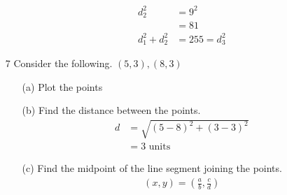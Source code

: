 \documentclass{article}
\begin{document}
\begin{enumerate}[widest={1}]
\begin{enumerate}
\begin{align*}
						d_2^2 &= 9^2 \\
						&= 81 \\
						d_1^2 + d_2^2 &= 255 = d_3^2
					\end{align*}
				\end{enumerate}
				\item[7] Consider the following. $(5, 3), (8, 3)$
				\begin{enumerate}
					\item[(a)] Plot the points
					\item[(b)] Find the distance between the points.
					\begin{align*}
						d &= \sqrt{(5-8)^2+(3-3)^2} \\
						  &= 3 \text{ units}
					\end{align*}
					\item[(c)] Find the midpoint of the line segment joining the points. \\
					\begin{align*}
						(x, y) = (\frac{a}{b}, \frac{c}{d})
					\end{align*}
				\end{enumerate}
			\end{enumerate}
		
\end{document}

